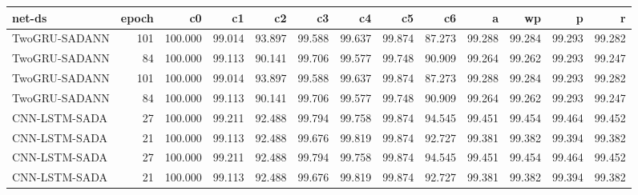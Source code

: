 \begin{tabular}{lrrrrrrrrrrrr}
\toprule
        net-ds &  epoch &      c0 &     c1 &     c2 &     c3 &     c4 &     c5 &     c6 &      a &     wp &      p &      r \\
\midrule
 TwoGRU-SADANN &    101 & 100.000 & 99.014 & 93.897 & 99.588 & 99.637 & 99.874 & 87.273 & 99.288 & 99.284 & 99.293 & 99.282 \\
 TwoGRU-SADANN &     84 & 100.000 & 99.113 & 90.141 & 99.706 & 99.577 & 99.748 & 90.909 & 99.264 & 99.262 & 99.293 & 99.247 \\
 TwoGRU-SADANN &    101 & 100.000 & 99.014 & 93.897 & 99.588 & 99.637 & 99.874 & 87.273 & 99.288 & 99.284 & 99.293 & 99.282 \\
 TwoGRU-SADANN &     84 & 100.000 & 99.113 & 90.141 & 99.706 & 99.577 & 99.748 & 90.909 & 99.264 & 99.262 & 99.293 & 99.247 \\
 CNN-LSTM-SADA &     27 & 100.000 & 99.211 & 92.488 & 99.794 & 99.758 & 99.874 & 94.545 & 99.451 & 99.454 & 99.464 & 99.452 \\
 CNN-LSTM-SADA &     21 & 100.000 & 99.113 & 92.488 & 99.676 & 99.819 & 99.874 & 92.727 & 99.381 & 99.382 & 99.394 & 99.382 \\
 CNN-LSTM-SADA &     27 & 100.000 & 99.211 & 92.488 & 99.794 & 99.758 & 99.874 & 94.545 & 99.451 & 99.454 & 99.464 & 99.452 \\
 CNN-LSTM-SADA &     21 & 100.000 & 99.113 & 92.488 & 99.676 & 99.819 & 99.874 & 92.727 & 99.381 & 99.382 & 99.394 & 99.382 \\
\bottomrule
\end{tabular}
